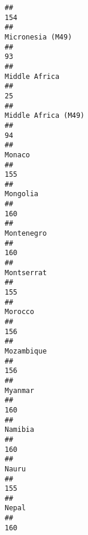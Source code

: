 \documentclass[]{article}
\begin{document}
\begin{verbatim}
##                                                                                          154 
##                                                                             Micronesia (M49) 
##                                                                                           93 
##                                                                                Middle Africa 
##                                                                                           25 
##                                                                          Middle Africa (M49) 
##                                                                                           94 
##                                                                                       Monaco 
##                                                                                          155 
##                                                                                     Mongolia 
##                                                                                          160 
##                                                                                   Montenegro 
##                                                                                          160 
##                                                                                   Montserrat 
##                                                                                          155 
##                                                                                      Morocco 
##                                                                                          156 
##                                                                                   Mozambique 
##                                                                                          156 
##                                                                                      Myanmar 
##                                                                                          160 
##                                                                                      Namibia 
##                                                                                          160 
##                                                                                        Nauru 
##                                                                                          155 
##                                                                                        Nepal 
##                                                                                          160 

\end{verbatim}
\end{document}
